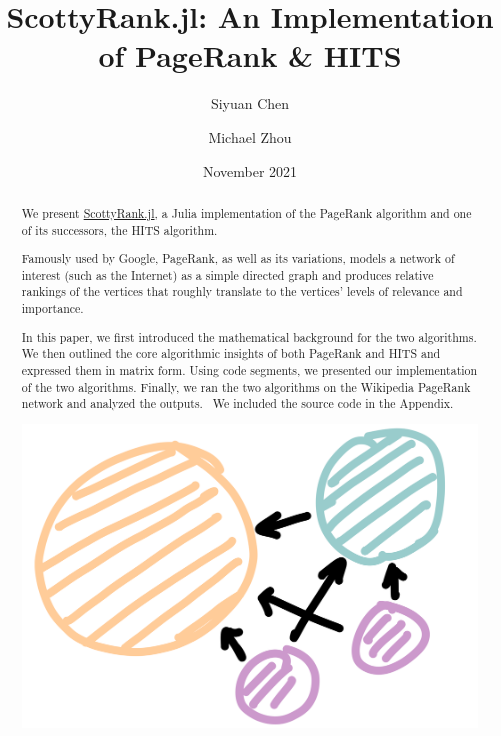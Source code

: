 \documentclass[12pt, titlepage, twoside]{amsart}
\begin{document}
\title[ScottyRank.jl]{ScottyRank.jl: An Implementation of PageRank \& HITS}

\author{Siyuan Chen}
\author{Michael Zhou}
\date{November 2021}

\begin{abstract}

We present \href{https://github.com/mzhou08/ScottyRank.jl}{ScottyRank.jl},
a Julia implementation of the PageRank algorithm and one of its successors, the HITS algorithm.

Famously used by Google, PageRank, as well as its variations,
models a network of interest (such as the Internet) as a simple directed graph and produces relative rankings
of the vertices that roughly translate to the vertices’ levels of relevance and importance.

In this paper, we first introduced the mathematical background for the two algorithms.
We then outlined the core algorithmic insights of both PageRank and HITS and expressed them in matrix form.
Using code segments, we presented our implementation of the two algorithms.
Finally, we ran the two algorithms on the Wikipedia PageRank network and analyzed the outputs.~\cite{pagerank}
We included the source code in the Appendix.

\begin{center}
  \includegraphics[scale=0.15]{../img/scottyrank-bare.png}
\end{center}
\end{abstract}

\maketitle
\end{document}
